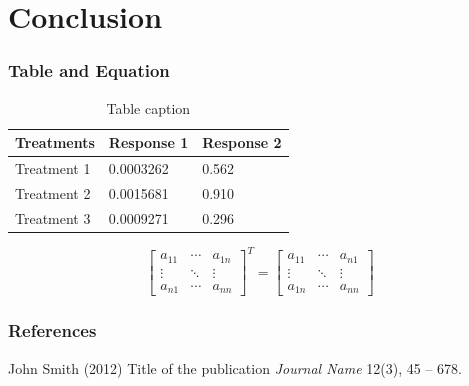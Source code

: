 \documentclass[10pt,aspectratio=32]{beamer}
\begin{document}
\section{Conclusion}

\begin{frame}
\frametitle{Table and Equation}
\vspace{-0.3cm}
	\begin{table}
		\begin{tabular}{l l l}
			\toprule
			\textbf{Treatments} & \textbf{Response 1} & \textbf{Response 2}\\
			\midrule
			Treatment 1 & 0.0003262 & 0.562 \\
			Treatment 2 & 0.0015681 & 0.910 \\
			Treatment 3 & 0.0009271 & 0.296 \\
			\bottomrule
		\end{tabular}
		\caption{Table caption}
	\end{table}

\begin{equation} %
\label{eq:matrix_transpose}
\left[
\begin{array}{ccc}
a_{11} & \cdots & a_{1n} \\
\vdots & \ddots & \vdots \\
a_{n1} & \cdots & a_{nn}
\end{array}
\right]^T
=
\left[
\begin{array}{ccc}
a_{11} & \cdots & a_{n1} \\
\vdots & \ddots & \vdots \\
a_{1n} & \cdots & a_{nn}
\end{array}
\right]
\end{equation}
\end{frame}


\begin{frame}
	\frametitle{References}
	\footnotesize{
		\begin{thebibliography}{99} %
			 John Smith (2012)
			\newblock Title of the publication
			\newblock \emph{Journal Name} 12(3), 45 -- 678.
		\end{thebibliography}
	}
\end{frame}


\begin{frame}
 	\titlepage
\end{frame}
\end{document}
